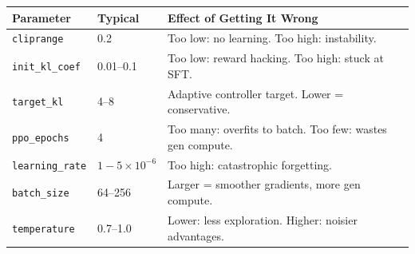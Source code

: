 \begin{tabular}{@{}lp{5cm}p{8cm}@{}}
\toprule
\textbf{Parameter} & \textbf{Typical} & \textbf{Effect of Getting It Wrong} \\
\midrule
\texttt{cliprange} & 0.2 & Too low: no learning. Too high: instability. \\
\texttt{init\_kl\_coef} & 0.01--0.1 & Too low: reward hacking. Too high: stuck at SFT. \\
\texttt{target\_kl} & 4--8 & Adaptive controller target. Lower = conservative. \\
\texttt{ppo\_epochs} & 4 & Too many: overfits to batch. Too few: wastes gen compute. \\
\texttt{learning\_rate} & $1{-}5 \times 10^{-6}$ & Too high: catastrophic forgetting. \\
\texttt{batch\_size} & 64--256 & Larger = smoother gradients, more gen compute. \\
\texttt{temperature} & 0.7--1.0 & Lower: less exploration. Higher: noisier advantages. \\
\bottomrule
\end{tabular}

